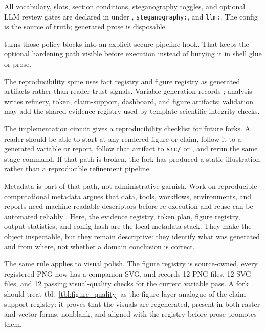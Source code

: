 \documentclass[
]{article}
\begin{document}
All vocabulary, slots, section conditions, steganography toggles, and
optional LLM review gates are declared in
 under ,
\texttt{steganography:}, and \texttt{llm:}. The config is the source of
truth; generated prose is disposable.

 turns those policy blocks into an
explicit secure-pipeline hook. That keeps the optional hardening path
visible before execution instead of burying it in shell glue or prose.

The reproducibility spine uses fact registry and figure registry as
generated artifacts rather than reader trust signals. Variable
generation records ; analysis writes refinery,
token, claim-support, dashboard, and figure artifacts; validation may
add the shared evidence registry used by template scientific-integrity
checks.

The implementation circuit gives a reproducibility checklist for future
forks. A reader should be able to start at any rendered figure or claim,
follow it to a generated variable or report, follow that artifact to
\texttt{src/} or , and rerun the same
stage command. If that path is broken, the fork has produced a static
illustration rather than a reproducible refinement pipeline.

Metadata is part of that path, not administrative garnish. Work on
reproducible computational metadata argues that data, tools, workflows,
environments, and reports need machine-readable descriptors before
re-execution and reuse can be automated reliably
\citep{chen2021metadata}. Here, the evidence registry, token plan,
figure registry, output statistics, and config hash are the local
metadata stack. They make the object inspectable, but they remain
descriptive: they identify what was generated and from where, not
whether a domain conclusion is correct.

The same rule applies to visual polish. The figure registry is
source-owned, every registered PNG now has a companion SVG, and
 records 12 PNG
files, 12 SVG files, and 12 passing visual-quality checks for the
current variable pass. A fork should treat tbl.~\ref{tbl:figure_quality}
as the figure-layer analogue of the claim-support registry: it proves
that the visuals are regenerated, present in both raster and vector
forms, nonblank, and aligned with the registry before prose promotes
them.
\end{document}
